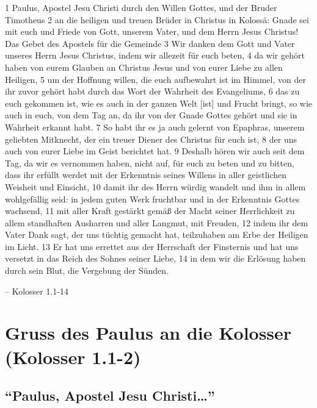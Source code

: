 \documentclass[
  12pt,
]{krantz}
\makeatletter
\newenvironment{kframe}{%
\medskip{}
\setlength{\fboxsep}{.8em}
 \def\at@end@of@kframe{}%
 \ifinner\ifhmode%
  \def\at@end@of@kframe{\end{minipage}}%
  \begin{minipage}{\columnwidth}%
 \fi\fi%
 \def\FrameCommand##1{\hskip\@totalleftmargin \hskip-\fboxsep
 \colorbox{shadecolor}{##1}\hskip-\fboxsep
     \hskip-\linewidth \hskip-\@totalleftmargin \hskip\columnwidth}%
 \MakeFramed {\advance\hsize-\width
   \@totalleftmargin\z@ \linewidth\hsize
   \@setminipage}}%
 {\par\unskip\endMakeFramed%
 \at@end@of@kframe}
\newenvironment{rmdblock}[1]
  {
  \begin{itemize}
  \renewcommand{\labelitemi}{
    \raisebox{-.7\height}[0pt][0pt]{
      {\setkeys{Gin}{width=3em,keepaspectratio}\texttt{[image: img/\#1]}}
    }
  }
  \setlength{\fboxsep}{1em}
  \begin{kframe}
  \item
  }
  {
  \end{kframe}
  \end{itemize}
  }
\newenvironment{rmdquote}
  {\begin{rmdblock}{quote}}
  {\end{rmdblock}}
\makeatother
\begin{document}
\begin{rmdquote}
1 Paulus, Apostel Jesu Christi durch den Willen Gottes, und der Bruder
Timotheus 2 an die heiligen und treuen Brüder in Christus in Kolossä:
Gnade sei mit euch und Friede von Gott, unserem Vater, und dem Herrn
Jesus Christus! Das Gebet des Apostels für die Gemeinde 3 Wir danken dem
Gott und Vater unseres Herrn Jesus Christus, indem wir allezeit für euch
beten, 4 da wir gehört haben von eurem Glauben an Christus Jesus und von
eurer Liebe zu allen Heiligen, 5 um der Hoffnung willen, die euch
aufbewahrt ist im Himmel, von der ihr zuvor gehört habt durch das Wort
der Wahrheit des Evangeliums, 6 das zu euch gekommen ist, wie es auch in
der ganzen Welt {[}ist{]} und Frucht bringt, so wie auch in euch, von
dem Tag an, da ihr von der Gnade Gottes gehört und sie in Wahrheit
erkannt habt. 7 So habt ihr es ja auch gelernt von Epaphras, unserem
geliebten Mitknecht, der ein treuer Diener des Christus für euch ist, 8
der uns auch von eurer Liebe im Geist berichtet hat. 9 Deshalb hören wir
auch seit dem Tag, da wir es vernommen haben, nicht auf, für euch zu
beten und zu bitten, dass ihr erfüllt werdet mit der Erkenntnis seines
Willens in aller geistlichen Weisheit und Einsicht, 10 damit ihr des
Herrn würdig wandelt und ihm in allem wohlgefällig seid: in jedem guten
Werk fruchtbar und in der Erkenntnis Gottes wachsend, 11 mit aller Kraft
gestärkt gemäß der Macht seiner Herrlichkeit zu allem standhaften
Ausharren und aller Langmut, mit Freuden, 12 indem ihr dem Vater Dank
sagt, der uns tüchtig gemacht hat, teilzuhaben am Erbe der Heiligen im
Licht. 13 Er hat uns errettet aus der Herrschaft der Finsternis und hat
uns versetzt in das Reich des Sohnes seiner Liebe, 14 in dem wir die
Erlösung haben durch sein Blut, die Vergebung der Sünden.

-- Kolosser 1.1-14
\end{rmdquote}

\hypertarget{gruss-des-paulus-an-die-kolosser-kolosser-1.1-2}{%
\section{Gruss des Paulus an die Kolosser (Kolosser 1.1-2)}\label{gruss-des-paulus-an-die-kolosser-kolosser-1.1-2}}

\hypertarget{paulus-apostel-jesu-christi}{%
\subsection{\texorpdfstring{``Paulus, Apostel Jesu Christi\ldots{}''}{``Paulus, Apostel Jesu Christi\ldots''}}\label{paulus-apostel-jesu-christi}}
\end{document}
